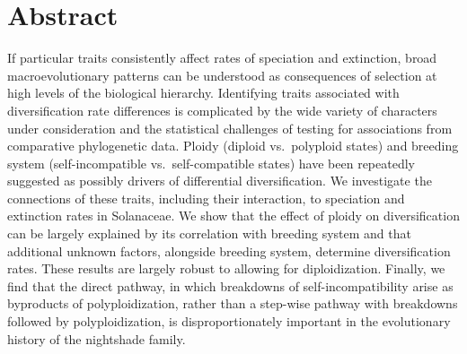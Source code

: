 \section{Abstract}

If particular traits consistently affect rates of speciation and extinction, broad macroevolutionary patterns can be understood as consequences of selection at high levels of the biological hierarchy.
Identifying traits associated with diversification rate differences is complicated by the wide variety of characters under consideration and the statistical challenges of testing for associations from comparative phylogenetic data. %
Ploidy (diploid vs.\ polyploid states) and breeding system (self-incompatible vs.\ self-compatible states) have been repeatedly suggested as possibly drivers of differential diversification.
We investigate the connections of these traits, including their interaction, to speciation and extinction rates in Solanaceae.
We show that the effect of ploidy on diversification can be largely explained by its correlation with breeding system and that additional unknown factors, alongside breeding system, determine diversification rates.
These results are largely robust to allowing for diploidization. %
Finally, we find that the direct pathway, in which breakdowns of self-incompatibility arise as byproducts of polyploidization, rather than a step-wise pathway with breakdowns followed by polyploidization, is disproportionately important in the evolutionary history of the nightshade family.
